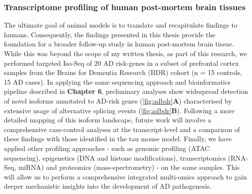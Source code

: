 \subsubsection{Transcriptome profiling of human post-mortem brain tissues}  
The ultimate goal of animal models is to translate and recapitulate findings to humans. Consequently, the findings presented in this thesis provide the foundation for a broader follow-up study in human post-mortem brain tissue. While this was beyond the scope of my written thesis, as part of this research, we performed targeted Iso-Seq of 20 AD risk-genes in a subset of prefrontal cortex samples from the Brains for Dementia Research (BDR) cohort (n = 15 controls, 15 AD cases). In applying the same sequencing approach and bioinformatics pipeline described in \textbf{Chapter 6}, preliminary analyses show widespread detection of novel isoforms annotated to AD-risk genes (\cref{fig:adbdr}\textbf{A}) characterised by extensive usage of alternative splicing events (\cref{fig:adbdr}\textbf{B}). Following a more detailed mapping of this isoform landscape, future work will involve a comprehensive case-control analyses at the transcript-level and a comparison of these findings with those identified in the tau mouse model. Finally, we have applied other profiling approaches - such as genomic profiling (ATAC sequencing), epigenetics (DNA and histone modifications), transcriptomics (RNA-Seq, miRNA) and proteomics (mass-spectrometry) - on the same samples. This will allow us to perform a comprehensive integrated multi-omics approach to gain deeper mechanistic insights into the development of AD pathogenesis.     

